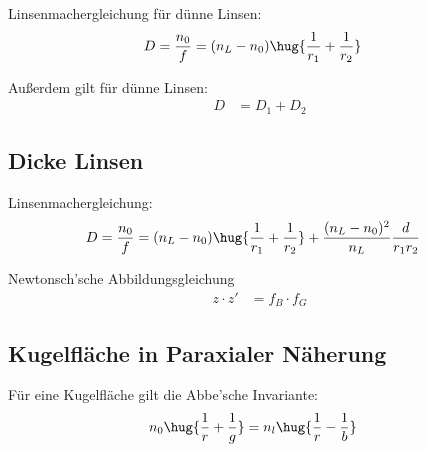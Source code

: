 \documentclass[twocolumn]{summery}
\begin{document}
Linsenmachergleichung für dünne Linsen:
\begin{align*}
    D = \frac {n_0}f &= (n_L - n_0)\hug{\frac 1{r_1} + \frac 1{r_2}}
\end{align*}

Außerdem gilt für dünne Linsen:
\begin{align*}
    D &= D_1 + D_2
\end{align*}

\subsection{Dicke Linsen}
Linsenmachergleichung:
\begin{align*}
    D = \frac {n_0}f &= (n_L - n_0)\hug{\frac 1{r_1} + \frac 1{r_2}}
    + \frac{(n_L - n_0)^2}{n_L}\frac{d}{r_1r_2}
\end{align*}

Newtonsch'sche Abbildungsgleichung
\begin{align*}
    z\cdot z' &= f_B \cdot f_G
\end{align*}

\subsection{Kugelfläche in Paraxialer Näherung}
Für eine Kugelfläche gilt die Abbe'sche Invariante:
\begin{align*}
    n_0 \hug{\frac 1r + \frac 1g} &= n_l \hug {\frac 1r - \frac 1b}
\end{align*}
 
\end{document}

